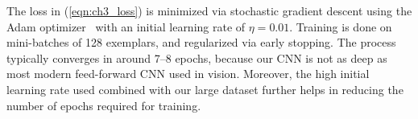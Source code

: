 The loss in (\ref{eqn:ch3_loss}) is minimized via stochastic gradient descent using the Adam optimizer~\cite{kingma-iclr-15} with an initial learning rate of $\eta=0.01$. Training is done on mini-batches of 128 exemplars, and regularized via early stopping. The process typically converges in around 7--8 epochs, because our CNN is not as deep as most modern feed-forward CNN used in vision. Moreover, the high initial learning rate used combined with our large dataset further helps in reducing the number of epochs required for training.



